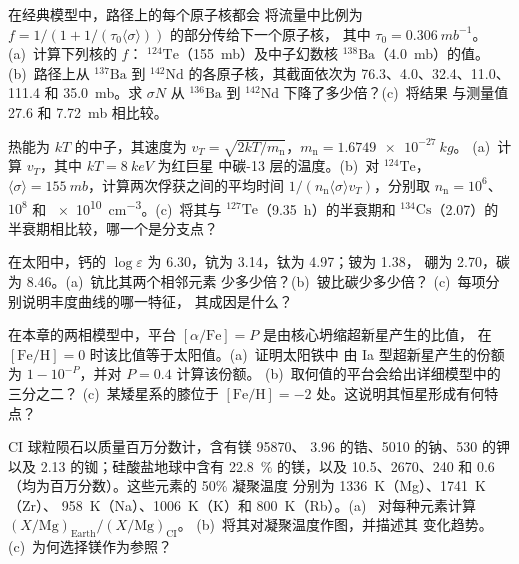 \begin{exercise}[$\star\star$]\label{exo:b3:origin-of-elements:6}
在经典模型中，路径上的每个原子核都会
将流量中比例为 $f = 1/(1 + 1/(\tau_0\langle\sigma\rangle))$ 的部分传给下一个原子核，
其中 $\tau_0 = \qty{0.306}{mb^{-1}}$。(a)~计算下列核的 $f$：
$^{124}\mathrm{Te}$（\qty{155}{mb}）及中子幻数核
$^{138}\mathrm{Ba}$（\qty{4.0}{mb}）的值。(b)~路径上从
$^{137}\mathrm{Ba}$ 到 $^{142}\mathrm{Nd}$ 的各原子核，其截面依次为
\num{76.3}、\num{4.0}、\num{32.4}、\num{11.0}、
\num{111.4} 和 \qty{35.0}{mb}。求 $\sigma N$ 从
$^{136}\mathrm{Ba}$ 到 $^{142}\mathrm{Nd}$ 下降了多少倍？(c)~将结果
与测量值 \num{27.6} 和 \qty{7.72}{mb} 相比较。
\end{exercise}

\begin{exercise}[$\star\star$]\label{exo:b3:origin-of-elements:7}
热能为 $kT$ 的中子，其速度为
$v_T = \sqrt{2kT/m_\mathrm{n}}$，$m_\mathrm{n} = \qty{1.6749e-27}{kg}$。
(a)~计算 $v_T$，其中 $kT = \qty{8}{keV}$ 为红巨星
中碳-13 层的温度。(b)~对 $^{124}\mathrm{Te}$，
$\langle\sigma\rangle = \qty{155}{mb}$，计算两次俘获之间的平均时间
$1/(n_\mathrm{n}\langle\sigma\rangle v_T)$，分别取
$n_\mathrm{n} = 10^6$、$10^8$ 和 \qty{e10}{cm^{-3}}。(c)~将其与
$^{127}\mathrm{Te}$（\qty{9.35}{h}）的半衰期和
$^{134}\mathrm{Cs}$（\qty{2.07}{}）的半衰期相比较，哪一个是分支点？
\end{exercise}

\begin{exercise}[$\star\star$]\label{exo:b3:origin-of-elements:8}
在太阳中，钙的 $\log\varepsilon$ 为 \num{6.30}，钪为
\num{3.14}，钛为 \num{4.97}；铍为 \num{1.38}，
硼为 \num{2.70}，碳为 \num{8.46}。(a)~钪比其两个相邻元素
少多少倍？(b)~铍比碳少多少倍？
(c)~每项分别说明丰度曲线的哪一特征，
其成因是什么？
\end{exercise}

\begin{exercise}[$\star\star$]\label{exo:b3:origin-of-elements:9}
在本章的两相模型中，平台
$[\alpha/\mathrm{Fe}] = P$ 是由核心坍缩超新星产生的比值，
在 $[\mathrm{Fe/H}] = 0$ 时该比值等于太阳值。(a)~证明太阳铁中
由 Ia 型超新星产生的份额为 $1 - 10^{-P}$，并对 $P = 0.4$ 计算该份额。
(b)~取何值的平台会给出详细模型中的三分之二？
(c)~某矮星系的膝位于
$[\mathrm{Fe/H}] = -2$ 处。这说明其恒星形成有何特点？
\end{exercise}

\begin{exercise}[$\star\star\star$]\label{exo:b3:origin-of-elements:10}
CI 球粒陨石以质量百万分数计，含有镁 \num{95870}、
\num{3.96} 的锆、\num{5010} 的钠、\num{530}
的钾以及 \num{2.13} 的铷；硅酸盐地球中含有
\qty{22.8}{\percent} 的镁，以及 \num{10.5}、\num{2670}、\num{240}
和 \num{0.6}（均为百万分数）。这些元素的 50\% 凝聚温度
分别为 \qty{1336}{K}（Mg）、\qty{1741}{K}（Zr）、
\qty{958}{K}（Na）、\qty{1006}{K}（K）和 \qty{800}{K}（Rb）。(a)~
对每种元素计算 $(X/\mathrm{Mg})_\mathrm{Earth}/(X/\mathrm{Mg})_\mathrm{CI}$。
(b)~将其对凝聚温度作图，并描述其
变化趋势。(c)~为何选择镁作为参照？
\end{exercise}

